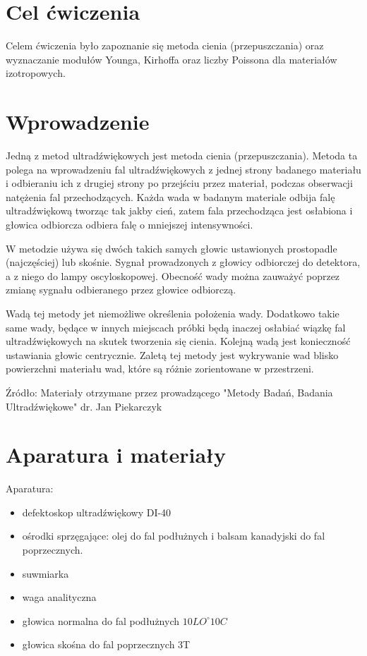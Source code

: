 \documentclass[a4paper,12pt]{article}
\begin{document}
    



\section{Cel ćwiczenia}

Celem ćwiczenia było zapoznanie się  metoda cienia (przepuszczania) oraz wyznaczanie modułów Younga, Kirhoffa oraz liczby Poissona dla materiałów izotropowych.

\section{Wprowadzenie}

Jedną z metod ultradźwiękowych jest metoda cienia (przepuszczania). Metoda ta polega na wprowadzeniu fal ultradźwiękowych z jednej strony badanego materiału i odbieraniu ich z drugiej strony po przejściu przez materiał, podczas obserwacji natężenia fal przechodzących. Każda wada w badanym materiale odbija falę ultradźwiękową tworząc tak jakby cień, zatem fala przechodząca jest osłabiona i głowica odbiorcza odbiera falę o mniejszej intensywności.

W metodzie używa się dwóch takich samych głowic ustawionych prostopadle (najczęściej) lub skośnie. Sygnał prowadzonych z głowicy odbiorczej do detektora, a z niego do lampy oscyloskopowej. Obecność wady można zauważyć poprzez zmianę sygnału odbieranego przez głowice odbiorczą.

Wadą tej metody jet niemożliwe określenia położenia wady. Dodatkowo takie same wady, będące w innych miejscach próbki będą inaczej osłabiać wiązkę fal ultradźwiękowych na skutek tworzenia się cienia. Kolejną wadą jest konieczność ustawiania głowic centrycznie. Zaletą tej metody jest wykrywanie wad blisko powierzchni materiału wad, które są różnie zorientowane w przestrzeni.
\newline

Źródło: Materiały otrzymane przez prowadzącego "Metody Badań, Badania Ultradźwiękowe" dr. Jan Piekarczyk

\section{Aparatura i materiały}

Aparatura:

\begin{itemize}
    \item defektoskop ultradźwiękowy  DI-40
    \item ośrodki sprzęgające: olej do fal podłużnych i balsam kanadyjski do fal poprzecznych.
    \item suwmiarka
    \item waga analityczna
    \item głowica normalna do fal podłużnych $10LO^\circ10C$
    \item głowica skośna do fal poprzecznych 3T
\end{itemize} 
 
\end{document}
